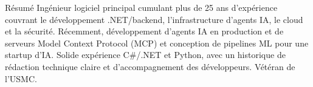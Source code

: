 \documentclass{resume} %
\begin{document}

\begin{rSection}{R\'esum\'e}
Ing\'enieur logiciel principal cumulant plus de 25 ans d'exp\'erience couvrant le d\'eveloppement .NET/backend, l'infrastructure d'agents IA, le cloud et la s\'ecurit\'e. R\'ecemment, d\'eveloppement d'agents IA en production et de serveurs Model Context Protocol (MCP) et conception de pipelines ML pour une startup d'IA. Solide exp\'erience C\#/.NET et Python, avec un historique de r\'edaction technique claire et d'accompagnement des d\'eveloppeurs. V\'et\'eran de l'USMC.
\end{rSection}


\end{document}
